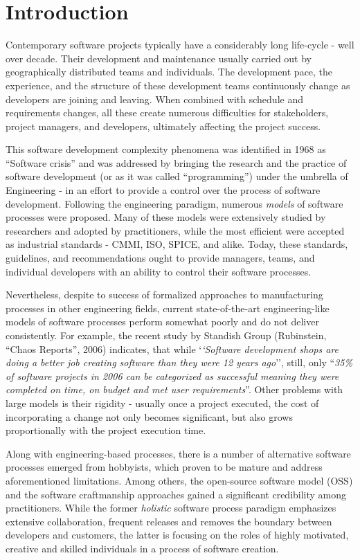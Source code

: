\chapter{Introduction}
Contemporary software projects typically have a considerably long life-cycle - well over decade.
Their development and maintenance usually carried out by geographically distributed teams 
and individuals. The development pace, the experience, and the structure of these development 
teams continuously change as developers are joining and leaving. When combined with
schedule and requirements changes, all these create numerous difficulties for stakeholders,
project managers, and developers, ultimately affecting the project success. 

This software development complexity phenomena was identified in 1968 as ``Software crisis'' 
and was addressed by bringing the research and the practice of software development 
(or as it was called ``programming'') under the umbrella of Engineering - in an effort to provide a 
control over the process of software development. 
Following the engineering paradigm, numerous \textit{models} of software processes were proposed.
Many of these models were extensively studied by researchers and adopted by practitioners, 
while the most efficient were accepted as industrial standards - CMMI, ISO, SPICE, and alike.
Today, these standards, guidelines, and recommendations ought to provide managers, teams, 
and individual developers with an ability to control their software processes.

Nevertheless, despite to success of formalized approaches to manufacturing processes in other 
engineering fields, current state-of-the-art engineering-like models of software processes perform 
somewhat poorly and do not deliver consistently. 
For example, the recent study by Standish Group (Rubinstein, ``Chaos Reports'', 2006) indicates,
that while `\textit{`Software development shops are doing a better job creating software than they were 
12 years ago}'', still, only ``\textit{35\% of software projects in 2006 can be categorized 
as successful meaning they were completed on time, on budget and met user requirements}”.
Other problems with large models is their rigidity - usually once a project executed, the cost of 
incorporating a change not only becomes significant, but also grows proportionally with 
the project execution time.

Along with engineering-based processes, there is a number of alternative software processes 
emerged from hobbyists, which proven to be mature and address aforementioned limitations. 
Among others, the open-source software model (OSS) and the software craftmanship approaches gained a 
significant credibility among practitioners.
While the former \textit{holistic} software process paradigm emphasizes extensive collaboration, frequent releases 
and removes the boundary between developers and customers, the latter is focusing on the roles 
of highly motivated, creative and skilled individuals in a process of software creation. 

